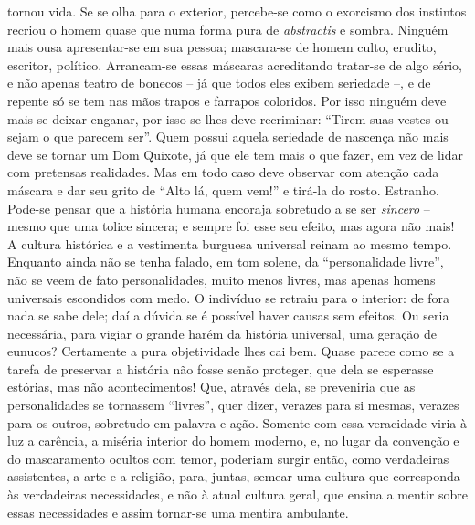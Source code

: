 tornou vida. Se se olha para o exterior, percebe-se como o exorcismo dos
instintos recriou o homem quase que numa forma pura de
\emph{abstractis} e sombra. Ninguém mais ousa apresentar-se em sua
pessoa; mascara-se de homem culto, erudito, escritor, político.
Arrancam-se essas máscaras acreditando tratar-se de algo sério, e não
apenas teatro de bonecos -- já que todos eles exibem seriedade --, e de
repente só se tem nas mãos trapos e farrapos coloridos. Por isso ninguém
deve mais se deixar enganar, por isso se lhes deve recriminar: ``Tirem
suas vestes ou sejam o que parecem ser''. Quem possui aquela seriedade
de nascença não mais deve se tornar um Dom Quixote, já que ele tem mais
o que fazer, em vez de lidar com pretensas realidades. Mas em todo caso
deve observar com atenção cada máscara e dar seu grito de ``Alto lá,
quem vem!'' e tirá-la do rosto. Estranho. Pode-se pensar que a história
humana encoraja sobretudo a se ser \emph{sincero} -- mesmo que uma
tolice sincera; e sempre foi esse seu efeito, mas agora não mais! A
cultura histórica e a vestimenta burguesa universal reinam ao mesmo
tempo. Enquanto ainda não se tenha falado, em tom solene, da
``personalidade livre'', não se veem de fato personalidades, muito menos
livres, mas apenas homens universais escondidos com medo. O indivíduo se
retraiu para o interior: de fora nada se sabe dele; daí a dúvida se é
possível haver causas sem efeitos. Ou seria necessária, para vigiar o
grande harém da história universal, uma geração de eunucos? Certamente a
pura objetividade lhes cai bem. Quase parece como se a tarefa de
preservar a história não fosse senão proteger, que dela se esperasse
estórias, mas não acontecimentos! Que, através dela, se preveniria que
as personalidades se tornassem ``livres'', quer dizer, verazes para si
mesmas, verazes para os outros, sobretudo em palavra e ação. Somente com
essa veracidade viria à luz a carência, a miséria interior do homem
moderno, e, no lugar da convenção e do mascaramento ocultos com temor,
poderiam surgir então, como verdadeiras assistentes, a arte e a
religião, para, juntas, semear uma cultura que corresponda às
verdadeiras necessidades, e não à atual cultura geral, que ensina a
mentir sobre essas necessidades e assim tornar-se uma mentira ambulante.

